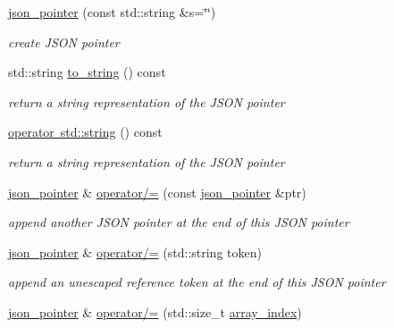 \begin{DoxyCompactItemize}
\item 
\mbox{\hyperlink{classnlohmann_1_1json__pointer_a7f32d7c62841f0c4a6784cf741a6e4f8}{json\+\_\+pointer}} (const std\+::string \&s=\char`\"{}\char`\"{})
\begin{DoxyCompactList}\small\item\em create J\+S\+ON pointer \end{DoxyCompactList}\item 
std\+::string \mbox{\hyperlink{classnlohmann_1_1json__pointer_a3d4b15d32d096e3776c5d2c773b524f5}{to\+\_\+string}} () const
\begin{DoxyCompactList}\small\item\em return a string representation of the J\+S\+ON pointer \end{DoxyCompactList}\item 
\mbox{\hyperlink{classnlohmann_1_1json__pointer_ae9015c658f99cf3d48a8563accc79988}{operator std\+::string}} () const
\begin{DoxyCompactList}\small\item\em return a string representation of the J\+S\+ON pointer \end{DoxyCompactList}\item 
\mbox{\hyperlink{classnlohmann_1_1json__pointer}{json\+\_\+pointer}} \& \mbox{\hyperlink{classnlohmann_1_1json__pointer_a7395bd0af29ac23fd3f21543c935cdfa}{operator/=}} (const \mbox{\hyperlink{classnlohmann_1_1json__pointer}{json\+\_\+pointer}} \&ptr)
\begin{DoxyCompactList}\small\item\em append another J\+S\+ON pointer at the end of this J\+S\+ON pointer \end{DoxyCompactList}\item 
\mbox{\hyperlink{classnlohmann_1_1json__pointer}{json\+\_\+pointer}} \& \mbox{\hyperlink{classnlohmann_1_1json__pointer_abdd21567b2b1d69329af0f520335e68b}{operator/=}} (std\+::string token)
\begin{DoxyCompactList}\small\item\em append an unescaped reference token at the end of this J\+S\+ON pointer \end{DoxyCompactList}\item 
\mbox{\hyperlink{classnlohmann_1_1json__pointer}{json\+\_\+pointer}} \& \mbox{\hyperlink{classnlohmann_1_1json__pointer_a64c8401529131bad1e486d91d703795f}{operator/=}} (std\+::size\+\_\+t \mbox{\hyperlink{classnlohmann_1_1json__pointer_ac53f5b79dd91da78743c437832f57ce4}{array\+\_\+index}})

\end{DoxyCompactItemize}
